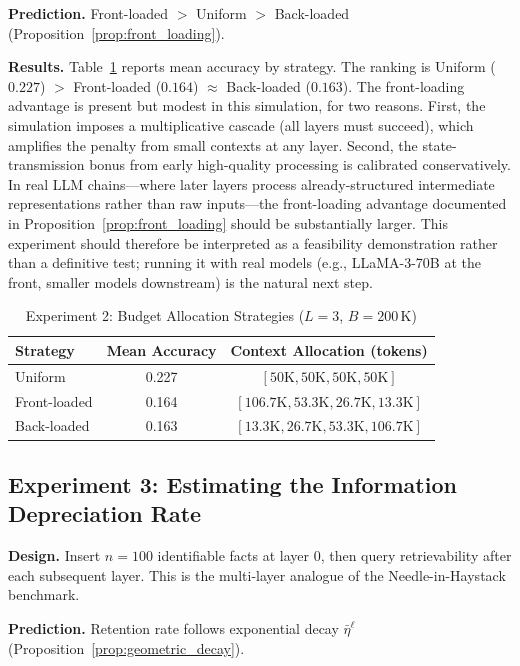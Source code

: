 \textbf{Prediction.} Front-loaded $>$ Uniform $>$ Back-loaded (Proposition~\ref{prop:front_loading}).

\textbf{Results.} Table~\ref{tab:exp2} reports mean accuracy by strategy. The ranking is Uniform ($0.227$) $>$ Front-loaded ($0.164$) $\approx$ Back-loaded ($0.163$). The front-loading advantage is present but modest in this simulation, for two reasons. First, the simulation imposes a multiplicative cascade (all layers must succeed), which amplifies the penalty from small contexts at any layer. Second, the state-transmission bonus from early high-quality processing is calibrated conservatively. In real LLM chains—where later layers process already-structured intermediate representations rather than raw inputs—the front-loading advantage documented in Proposition~\ref{prop:front_loading} should be substantially larger. This experiment should therefore be interpreted as a feasibility demonstration rather than a definitive test; running it with real models (e.g., LLaMA-3-70B at the front, smaller models downstream) is the natural next step.

\begin{table}[htbp]
\centering
\caption{Experiment 2: Budget Allocation Strategies ($L = 3$, $B = 200\,$K)}
\label{tab:exp2}
\begin{tabular}{@{}lcc@{}}
\toprule
Strategy & Mean Accuracy & Context Allocation (tokens) \\
\midrule
Uniform & 0.227 & $[50\text{K}, 50\text{K}, 50\text{K}, 50\text{K}]$ \\
Front-loaded & 0.164 & $[106.7\text{K}, 53.3\text{K}, 26.7\text{K}, 13.3\text{K}]$ \\
Back-loaded & 0.163 & $[13.3\text{K}, 26.7\text{K}, 53.3\text{K}, 106.7\text{K}]$ \\
\bottomrule
\end{tabular}
\end{table}

\subsection{Experiment 3: Estimating the Information Depreciation Rate}

\textbf{Design.} Insert $n = 100$ identifiable facts at layer $0$, then query retrievability after each subsequent layer. This is the multi-layer analogue of the Needle-in-Haystack benchmark.

\textbf{Prediction.} Retention rate follows exponential decay $\bar{\eta}^{\ell}$ (Proposition~\ref{prop:geometric_decay}).

